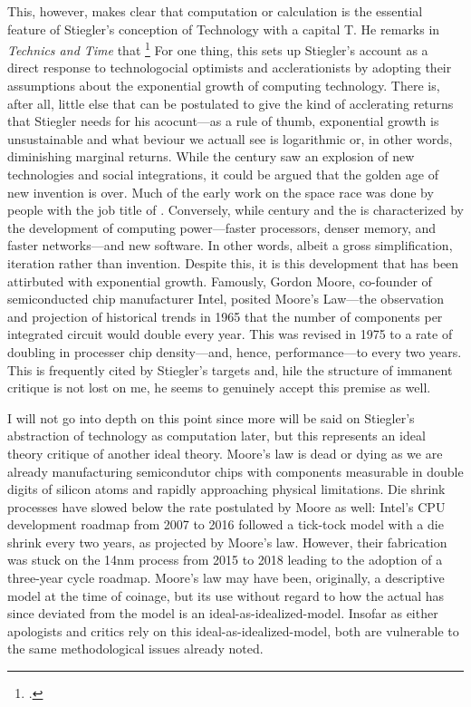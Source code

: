 \documentclass[letterpaper,notitlepage,12pt]{article}
\begin{document}
This, however, makes clear that computation or calculation is the essential
feature of Stiegler's conception of Technology with a capital T.
He remarks in \textit{Technics and Time} that \footcite[p. 19]{stiegler_technics_1998}
For one thing, this sets up Stiegler's account as a direct response to
technologocial optimists and acclerationists by adopting their assumptions about
the exponential growth of computing technology.
There is, after all, little else that can be postulated to give the kind of
acclerating returns that Stiegler needs for his acocunt---as a rule of thumb,
exponential growth is unsustainable and what beviour we actuall see is
logarithmic or, in other words, diminishing marginal returns.
While the  century saw an explosion of new technologies and social
integrations, it could be argued that the golden age of new invention is over.
Much of the early work on the space race was done by people with the job title
of .
Conversely, while  century and the  is
characterized by the development of computing power---faster processors, denser
memory, and faster networks---and new software.
In other words, albeit a gross simplification, iteration rather than invention.
Despite this, it is this development that has been attirbuted with exponential
growth.
Famously, Gordon Moore, co-founder of semiconducted chip manufacturer Intel,
posited Moore's Law---the observation and projection of historical trends in
1965 that the number of components per integrated circuit would double every
year.
This was revised in 1975 to a rate of doubling in processer chip density---and,
hence, performance---to every two years.
This  is frequently cited by Stiegler's targets and, hile the
structure of immanent critique is not lost on me, he seems to genuinely accept
this premise as well.

I will not go into depth on this point since more will be said on Stiegler's
abstraction of technology as computation later, but this represents an ideal
theory critique of another ideal theory.
Moore's law is dead or dying as we are already manufacturing semicondutor chips
with components measurable in double digits of silicon atoms and rapidly
approaching physical limitations.
Die shrink processes have slowed below the rate postulated by Moore as well:
Intel's CPU development roadmap from 2007 to 2016 followed a tick-tock model
with a die shrink every two years, as projected by Moore's law. However, their
fabrication was stuck on the 14nm process from 2015 to 2018 leading to the
adoption of a three-year cycle roadmap.
Moore's law may have been, originally, a descriptive model at the time of
coinage, but its use without regard to how the actual has since deviated from
the model is an ideal-as-idealized-model.
Insofar as either apologists and critics rely on this ideal-as-idealized-model,
both are vulnerable to the same methodological issues already noted.
\end{document}
